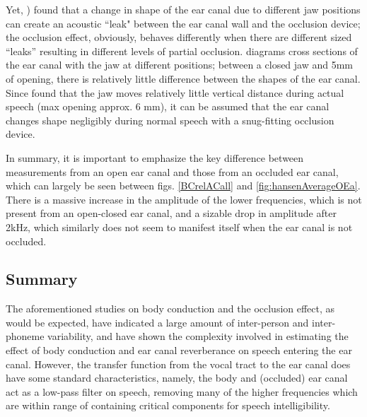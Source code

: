 \documentclass[dissertation,copyright]{uathesis}
\begin{document}
Yet, \cite{hansen:97b}) found that a change in shape of the ear canal due to different jaw positions can create an acoustic ``leak" between the ear canal wall and the occlusion device; the occlusion effect, obviously, behaves differently when there are different sized ``leaks'' resulting in different levels of partial occlusion. 
\cite{hansen:97b} diagrams cross sections of the ear canal with the jaw at different positions; between a closed jaw and 5mm of opening, there is relatively little difference between the shapes of the ear canal.  Since \cite{borghese:97} found that the jaw moves relatively little vertical distance during actual speech (max opening approx. 6 mm), it can be assumed that the ear canal changes shape negligibly during normal speech with a snug-fitting occlusion device. 

In summary, it is important to emphasize the key difference between measurements from an open ear canal and those from an occluded ear canal, which can largely be seen between figs. \ref{BCrelACall} and \ref{fig:hansenAverageOEa}.  There is a massive increase in the amplitude of the lower frequencies, which is not present from an open-closed ear canal, and a sizable drop in amplitude after 2kHz, which similarly does not seem to manifest itself when the ear canal is not occluded.


\subsection{Summary}

The aforementioned studies on body conduction and the occlusion effect, as would be expected, have indicated a large amount of inter-person and inter-phoneme variability, and have shown the complexity involved in estimating the effect of body conduction and ear canal reverberance on speech entering the ear canal.  However, the transfer function from the vocal tract to the ear canal does have some standard characteristics, namely, the body and (occluded) ear canal act as a low-pass filter on speech, removing many of the higher frequencies which are within range of containing critical components for speech intelligibility.


\end{document}
